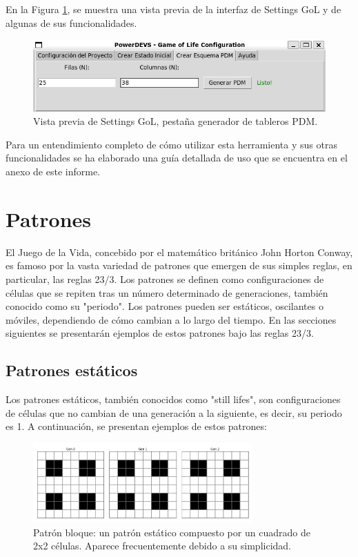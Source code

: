 \documentclass[]{article}
\begin{document}
En la Figura \ref{fig:settingsdevs}, se muestra una vista previa de la interfaz de Settings GoL y de algunas de sus funcionalidades.

\begin{figure}[H]
  \centering
  \includegraphics[width=1\textwidth]{../assets/pdevs/SettingsDevs.png}
  \caption{Vista previa de Settings GoL, pestaña generador de tableros PDM.}
  \label{fig:settingsdevs}
\end{figure}

Para un entendimiento completo de cómo utilizar esta herramienta y sus otras funcionalidades se ha elaborado una guía detallada de uso que se encuentra en el anexo de este informe.



\section{Patrones}
El Juego de la Vida, concebido por el matemático británico John Horton Conway, es famoso por la vasta variedad de patrones que emergen de sus simples reglas, en particular, las reglas 23/3. Los patrones se definen como configuraciones de células que se repiten tras un número determinado de generaciones, también conocido como su "periodo". Los patrones pueden ser estáticos, oscilantes o móviles, dependiendo de cómo cambian a lo largo del tiempo. En las secciones siguientes se presentarán ejemplos de estos patrones bajo las reglas 23/3.

\subsection{Patrones estáticos}
Los patrones estáticos, también conocidos como "still lifes", son configuraciones de células que no cambian de una generación a la siguiente, es decir, su periodo es 1. A continuación, se presentan ejemplos de estos patrones:

\begin{figure}[H]
  \centering
  \includegraphics[width=0.75\textwidth]{../assets/still_life/block/block.png}
  \caption{Patrón bloque: un patrón estático compuesto por un cuadrado de 2x2 células. Aparece frecuentemente debido a su simplicidad.}
  \label{fig:block}
\end{figure}
\end{document}
